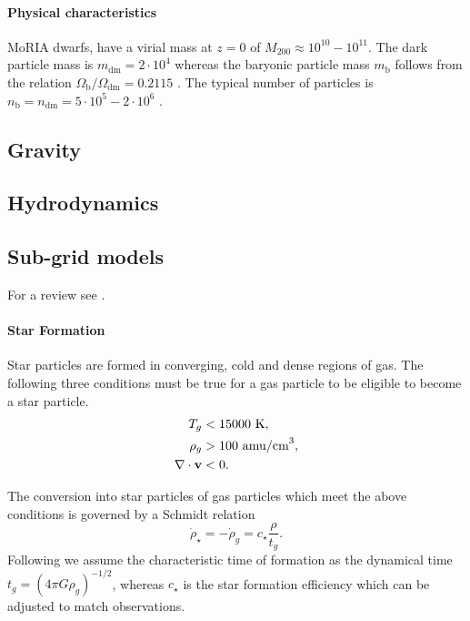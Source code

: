 \paragraph{Physical characteristics} MoRIA dwarfs, have a virial mass at $z=0$ of $M_{200} \approx 10^{10} - 10^{11}$\Msun{}. The dark particle mass is $m_{\mathrm{dm}} = 2 \cdot 10^4$ \Msun{} whereas the baryonic particle mass $m_{\mathrm{b}}$ follows from the relation $\Omega_\mathrm{b}/\Omega_{\mathrm{dm}} = 0.2115$ \citep{Planck2015}.
The typical number of particles is $n_\mathrm{b} = n_{\mathrm{dm}} = 5 \cdot 10^5 - 2 \cdot 10^6$ \Msun{}.

\subsection{Gravity}

\subsection{Hydrodynamics}
\subsection{Sub-grid models}
For a review see \citet{Verbeke2017, Vandenbroucke2016}.

\paragraph{Star Formation}
Star particles are formed in converging, cold and dense regions of gas.
The following three conditions must be true for a gas particle to be eligible to become a star particle.
\begin{align*}
 T_g &< 15000 \text{~K},\\
 \rho_g &> 100 \text{~amu/cm}^{3},\\
 \nabla \cdot \boldsymbol{\mathbf{v}} & < 0.
\end{align*}

The conversion into star particles of gas particles which meet the above conditions is governed by a Schmidt relation \citep{Schmidt1959}
\begin{equation}                                                                              
\dot{\rho}_\star = -\dot{\rho}_g = c_\star \frac{\rho}{t_g}.
\label{eq:schmidt_relation}
\end{equation}
Following \citep{Stinson2006} we assume the characteristic time of formation as the dynamical time $t_g = (4 \pi G \rho_g)^{-1/2}$, whereas $c_\star$ is the star formation efficiency which can be adjusted to match observations.

